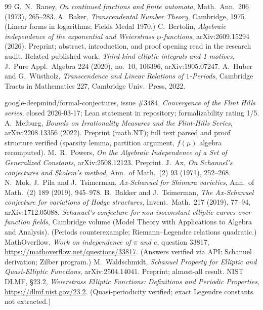 \documentclass[11pt]{amsart}
\theoremstyle{definition}
\theoremstyle{remark}
\numberwithin{equation}{section}
\begin{document}
\begin{thebibliography}{99}
 G.~N.~Raney, \emph{On continued fractions and finite automata}, Math.~Ann.~206 (1973), 265--283.
 A.~Baker, \emph{Transcendental Number Theory}, Cambridge, 1975. (Linear forms in logarithms; Fields Medal 1970.)
 C.~Bertolin, \emph{Algebraic independence of the exponential and Weierstrass $\wp$-functions}, arXiv:2609.15294 (2026). Preprint; abstract, introduction, and proof opening read in the research audit. Related published work: \emph{Third kind elliptic integrals and 1-motives}, J.~Pure Appl.~Algebra 224 (2020), no.~10, 106396, arXiv:1905.07247.
 A.~Huber and G.~W\"ustholz, \emph{Transcendence and Linear Relations of $1$-Periods}, Cambridge Tracts in Mathematics 227, Cambridge Univ.~Press, 2022.

 google-deepmind/formal-conjectures, issue \#3484, \emph{Convergence of the Flint Hills series}, closed 2026-03-17; Lean statement in repository; formalizability rating 1/5.
 A.~Meiburg, \emph{Bounds on Irrationality Measures and the Flint-Hills Series}, arXiv:2208.13356 (2022). Preprint (math.NT); full text parsed and proof structure verified (sparsity lemma, partition argument, $f(\mu)$ algebra recomputed).
 M.~R.~Powers, \emph{On the Algebraic Independence of a Set of Generalized Constants}, arXiv:2508.12123. Preprint.
 J.~Ax, \emph{On Schanuel's conjectures and Skolem's method}, Ann.~of Math.~(2) 93 (1971), 252--268.
 N.~Mok, J.~Pila and J.~Tsimerman, \emph{Ax-Schanuel for Shimura varieties}, Ann.~of Math.~(2) 189 (2019), 945--978.
 B.~Bakker and J.~Tsimerman, \emph{The Ax-Schanuel conjecture for variations of Hodge structures}, Invent.~Math.~217 (2019), 77--94, arXiv:1712.05088.
 \emph{Schanuel's conjecture for non-isoconstant elliptic curves over function fields}, Cambridge volume (Model Theory with Applications to Algebra and Analysis). (Periods counterexample; Riemann--Legendre relations quadratic.)
 MathOverflow, \emph{Work on independence of $\pi$ and $e$}, question 33817, \url{https://mathoverflow.net/questions/33817}. (Answers verified via API: Schanuel derivation; Zilber program.)
 M.~Waldschmidt, \emph{Schanuel Property for Elliptic and Quasi-Elliptic Functions}, arXiv:2504.14041. Preprint; almost-all result.
 NIST DLMF, \S23.2, \emph{Weierstrass Elliptic Functions: Definitions and Periodic Properties}, \url{https://dlmf.nist.gov/23.2}. (Quasi-periodicity verified; exact Legendre constants not extracted.)

\end{thebibliography}
\end{document}
